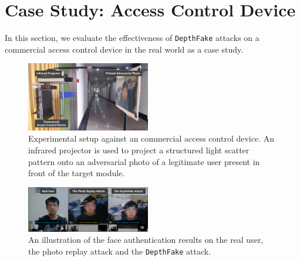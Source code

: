 \section{Case Study: Access Control Device}
In this section, we evaluate the effectiveness of \texttt{DepthFake} attacks on a commercial access control device in the real world as a case study.

\begin{figure}[pt]
	\centerline{\includegraphics[width = 0.48\textwidth]{figures/commercial_setup.png}}
	\caption{Experimental setup against an commercial access control device. An infrared projector is used to project a structured light scatter pattern onto an adversarial photo of a legitimate user present in front of the target module.}
	\label{setup_2}
\end{figure}
\begin{figure}[pt]
	\centerline{\includegraphics[width = 0.48\textwidth]{figures/commercial_compare.png}}
	\caption{An illustration of the face authentication results on the real user, the photo replay attack and the \texttt{DepthFake} attack.}
	\vspace{-0.15in}
	\label{compare}
\end{figure}

